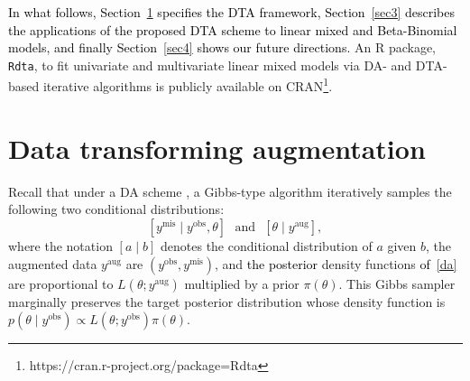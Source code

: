 \documentclass[12pt]{article}
\begin{document}
\textcolor{black}{In what follows, Section~\ref{sec2} specifies the DTA framework, Section~\ref{sec3} describes the applications of the proposed DTA scheme to linear mixed  and Beta-Binomial models, and finally Section~\ref{sec4} shows our future directions.} An R package, \texttt{Rdta},  to fit univariate and multivariate linear mixed models via DA- and DTA-based iterative algorithms is publicly available on CRAN\footnote{https://cran.r-project.org/package=Rdta}.

\section{Data transforming augmentation}\label{sec2}

Recall that under a DA scheme \citep{tanner1987calculation}, a Gibbs-type algorithm iteratively samples the following  two conditional distributions: 
\begin{equation}\label{da}
[y^{\textrm{mis}}\mid y^{\textrm{obs}}, \theta]~~~\textrm{and}~~~[\theta\mid y^{\textrm{aug}}],
\end{equation} 
where the notation $[a\mid b]$ denotes the conditional distribution of $a$ given $b$, the augmented data $y^{\textrm{aug}}$ are $(y^{\textrm{obs}}, y^{\textrm{mis}})$, and \textcolor{black}{the posterior} density functions \textcolor{black}{of~\eqref{da}} are proportional to $L(\theta; y^{\textrm{aug}})$ multiplied by a prior $\pi(\theta)$.  This Gibbs sampler marginally preserves the target posterior  distribution whose density function is $p(\theta\mid y^{\textrm{obs}})\propto L(\theta; y^{\textrm{obs}})\pi(\theta)$. 



\end{document}
